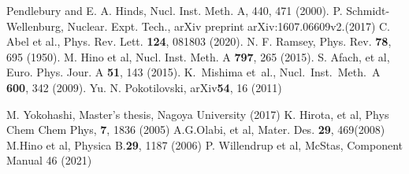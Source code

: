 \documentclass{jps-cp}
\begin{document}
\begin{thebibliography}{9}
  Pendlebury and E. A. Hinds, Nucl. Inst. Meth. A, 440, 471 (2000).
  P. Schmidt-Wellenburg, Nuclear. Expt. Tech., arXiv preprint arXiv:1607.06609v2.(2017)
    C. Abel et al., Phys. Rev. Lett. \textbf{124}, 081803 (2020). 
   N. F. Ramsey, Phys. Rev. \textbf{78}, 695 (1950).
   M. Hino et al, Nucl. Inst. Meth. A \textbf{797}, 265 (2015).
  S. Afach, et al, Euro. Phys. Jour. A \textbf{51}, 143 (2015).
  K.~Mishima et~al., Nucl.~Inst.~Meth.~A \textbf{600}, 342 (2009).
  Yu. N. Pokotilovski, arXiv\textbf{54},  16 (2011)

   M. Yokohashi, Master's thesis, Nagoya University (2017) 
  K. Hirota, et al, Phys Chem Chem Phys,  \textbf{7}, 1836 (2005)
  A.G.Olabi, et al, Mater. Des. \textbf{29}, 469(2008)
  M.Hino et al, Physica B.\textbf{29}, 1187 (2006)
  P. Willendrup et al, McStas, Component Manual 46 (2021)
\end{thebibliography}
\end{document}

